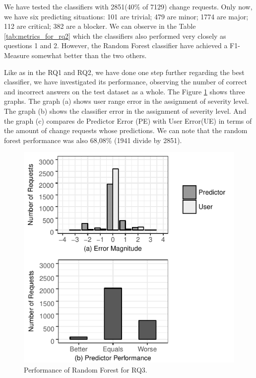 \documentclass[10pt, conference]{IEEEtran}
\begin{document}
We have tested the classifiers with 2851(40\% of 7129) change requests. Only now, we have six predicting situations: 101 are trivial; 479 are minor; 1774 are major; 112 are critical; 382 are a blocker. We can observe in the Table \ref{tab:metrics_for_rq2} which the classifiers also performed very closely as questions 1 and 2. However, the Random Forest classifier have achieved a F1-Measure somewhat better than the two others.


Like as in the RQ1 and RQ2, we have done one step further regarding the best classifier, we have investigated its performance, observing the number of correct and incorrect answers on the test dataset as a whole. The Figure \ref{fig:rf_performance_for_q3} shows three graphs. The graph (a) shows user range error in the assignment of severity level. The graph (b) shows the classifier error in the assignment of severity level. And the graph (c) compares de Predictor Error (PE) with User Error(UE) in terms of the amount of change requests whose predictions. We can note that the random forest performance was also 68,08\% (1941 divide by 2851). 


\begin{figure}[ht]
  \label{fig:rf_performance_for_q3}
  \includegraphics{figures/rf_performance_for_q3.pdf}
  \caption{Performance of Random Forest for RQ3.}
\end{figure}
\end{document}
